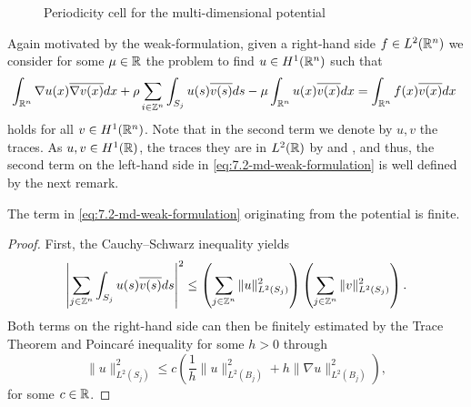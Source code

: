 \begin{figure}[!ht] \centering
	\caption{Periodicity cell for the multi-dimensional potential} \label{fig:md-cell}
\end{figure}

Again motivated by the weak-formulation, given a right-hand side $f \in L^{2}(\mathbb{R}^{n})$ we consider for some	 $\mu \in \mathbb{R}$ the problem to find $u \in H^{1}(\mathbb{R}^{n})$ such that
	\begin{equation}
		\int_{\R^{n}} \nabla u(x) \overline{\nabla v(x)} dx + \rho \sum_{i \in \Z^{n}} \int_{S_{j}} u(s) \overline{v(s)} ds - \mu \int_{\R^{n}} u(x) \overline{v(x)} dx = \int_{\R^{n}} f(x) \overline{v(x)} dx \label{eq:7.2-md-weak-formulation}
	\end{equation} 
holds for all $v \in H^{1}(\mathbb{R}^{n})$. Note that in the second term we denote by $u, v$ the traces. As $u, v \in H^{1}(\mathbb{R})$, the traces they are in $L^{2}(\mathbb{R})$ by \cite[page 251, Theorem 5.1]{evans1998partial} and \cite[page 164]{adams2003sobolev}, and thus, the second term on the left-hand side in \eqref{eq:7.2-md-weak-formulation} is well defined by the next remark.

\begin{remark} 
	The term in \eqref{eq:7.2-md-weak-formulation} originating from the potential is finite.
	
	\begin{proof}
	 First, the Cauchy–Schwarz inequality yields
	\[ \left| \sum_{j \in \mathbb{Z}^{n}} \int_{S_{j}} u(s) \overline{v(s)} ds \right|^{2} \leq \left( \sum_{j \in \mathbb{Z}^{n}} \| u \|_{L^{2}(S_{j})}^{2} \right) \left( \sum_{j \in \mathbb{Z}^{n}} \| v \|_{L^{2}(S_{j})}^{2} \right). \] 
	Both terms on the right-hand side can then be finitely estimated by the Trace Theorem \cite[page 258]{evans1998partial} and Poincaré inequality for some $h > 0$ through
	\[ \| u \|_{L^{2}(S_{j})}^{2} \leq c \left( \frac{1}{h} \|u\|_{L^{2}(B_{j})}^{2} + h \| \nabla u \|_{L^{2}(B_{j})}^{2} \right), \]	
	for some $c \in \mathbb{R}$.
	\end{proof}
\end{remark}

